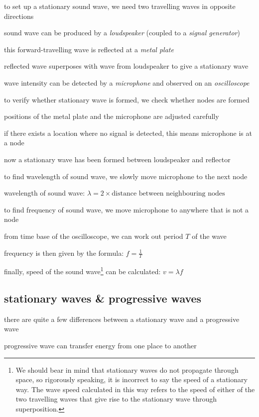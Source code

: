 \cmt to set up a stationary sound wave, we need two travelling waves in opposite directions

sound wave can be produced by a \emph{loudspeaker} (coupled to a \emph{signal generator})

this forward-travelling wave is reflected at a \emph{metal plate}

reflected wave superposes with wave from loudspeaker to give a stationary wave

wave intensity can be detected by a \emph{microphone} and observed on an \emph{oscilloscope}

\cmt to verify whether stationary wave is formed, we check whether nodes are formed

positions of the metal plate and the microphone are adjusted carefully

if there exists a location where no signal is detected, this means microphone is at a node

now a stationary wave has been formed between loudspeaker and reflector

\cmt to find wavelength of sound wave, we slowly move microphone to the next node

wavelength of sound wave: $\lambda = 2\times \text{distance between neighbouring nodes}$

\cmt to find frequency of sound wave, we move microphone to anywhere that is not a node

from time base of the oscilloscope, we can work out period $T$ of the wave

frequency is then given by the formula: $f=\frac{1}{T}$

\cmt finally,  speed of the sound wave\footnote{We should bear in mind that stationary waves do not propagate through space, so rigorously speaking, it is incorrect to say the speed of a stationary way. The wave speed calculated in this way refers to the speed of either of the two travelling waves that give rise to the stationary wave through superposition.} can be calculated: $v=\lambda f$




\subsection{stationary waves \& progressive waves}

there are quite a few differences between a stationary wave and a progressive wave

\cmt progressive wave can transfer energy from one place to another

